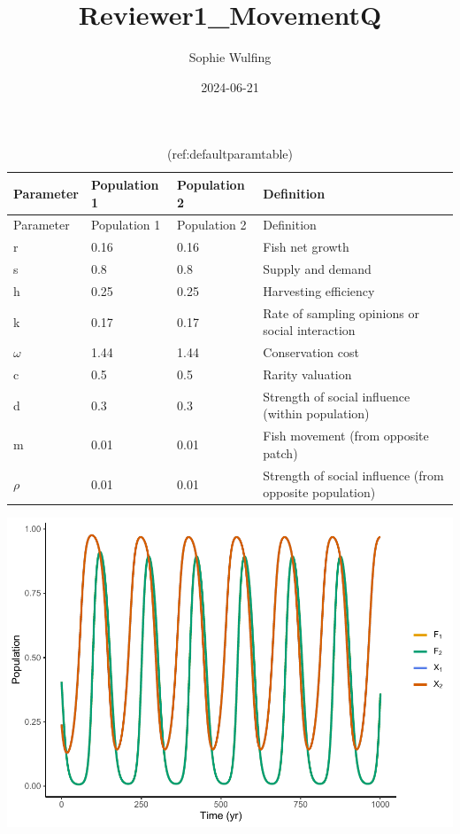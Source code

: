 \documentclass[
]{article}
\title{Reviewer1\_MovementQ}
\author{Sophie Wulfing}
\date{2024-06-21}
\begin{document}
\maketitle

\begin{longtable}[]{@{}llll@{}}
\caption{\label{tab:DefaultParamTable}(ref:defaultparamtable) \label{DefaultParamTable}}\tabularnewline
\toprule\noalign{}
Parameter & Population 1 & Population 2 & Definition \\
\midrule\noalign{}
\endfirsthead
\toprule\noalign{}
Parameter & Population 1 & Population 2 & Definition \\
\midrule\noalign{}
\endhead
\bottomrule\noalign{}
\endlastfoot
r & 0.16 & 0.16 & Fish net growth \\
s & 0.8 & 0.8 & Supply and demand \\
h & 0.25 & 0.25 & Harvesting efficiency \\
k & 0.17 & 0.17 & Rate of sampling opinions or social interaction \\
\(\omega\) & 1.44 & 1.44 & Conservation cost \\
c & 0.5 & 0.5 & Rarity valuation \\
d & 0.3 & 0.3 & Strength of social influence (within population) \\
m & 0.01 & 0.01 & Fish movement (from opposite patch) \\
\(\rho\) & 0.01 & 0.01 & Strength of social influence (from opposite population) \\
\end{longtable}

\includegraphics{ReviewerMovementTest_files/figure-latex/Bauch.Coupled-1.pdf}
\end{document}

